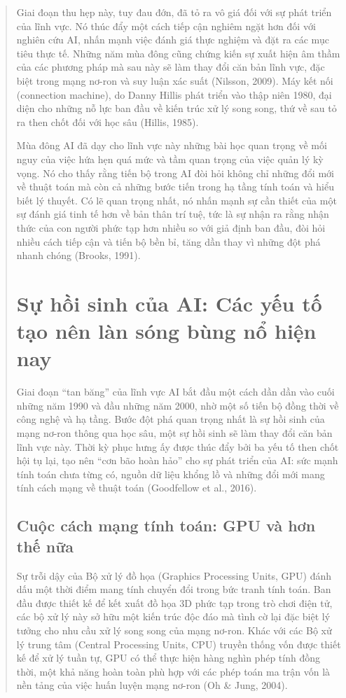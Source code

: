 \begin{quote}
Giai đoạn thu hẹp này, tuy đau đớn, đã tỏ ra vô giá đối với sự phát triển của lĩnh vực. Nó thúc đẩy một cách tiếp cận nghiêm ngặt hơn đối với nghiên cứu AI, nhấn mạnh việc đánh giá thực nghiệm và đặt ra các mục tiêu thực tế. Những năm mùa đông cũng chứng kiến sự xuất hiện âm thầm của các phương pháp mà sau này sẽ làm thay đổi căn bản lĩnh vực, đặc biệt trong mạng nơ-ron và suy luận xác suất (Nilsson, 2009). Máy kết nối (connection machine), do Danny Hillis phát triển vào thập niên 1980, đại diện cho những nỗ lực ban đầu về kiến trúc xử lý song song, thứ về sau tỏ ra then chốt đối với học sâu (Hillis, 1985).

Mùa đông AI đã dạy cho lĩnh vực này những bài học quan trọng về mối nguy của việc hứa hẹn quá mức và tầm quan trọng của việc quản lý kỳ vọng. Nó cho thấy rằng tiến bộ trong AI đòi hỏi không chỉ những đổi mới về thuật toán mà còn cả những bước tiến trong hạ tầng tính toán và hiểu biết lý thuyết. Có lẽ quan trọng nhất, nó nhấn mạnh sự cần thiết của một sự đánh giá tinh tế hơn về bản thân trí tuệ, tức là sự nhận ra rằng nhận thức của con người phức tạp hơn nhiều so với giả định ban đầu, đòi hỏi nhiều cách tiếp cận và tiến bộ bền bỉ, tăng dần thay vì những đột phá nhanh chóng (Brooks, 1991).

\section{Sự hồi sinh của AI: Các yếu tố tạo nên làn sóng bùng nổ hiện nay}

Giai đoạn ``tan băng'' của lĩnh vực AI bắt đầu một cách dần dần vào cuối những năm 1990 và đầu những năm 2000, nhờ một số tiến bộ đồng thời về công nghệ và hạ tầng. Bước đột phá quan trọng nhất là sự hồi sinh của mạng nơ-ron thông qua học sâu, một sự hồi sinh sẽ làm thay đổi căn bản lĩnh vực này. Thời kỳ phục hưng ấy được thúc đẩy bởi ba yếu tố then chốt hội tụ lại, tạo nên ``cơn bão hoàn hảo'' cho sự phát triển của AI: sức mạnh tính toán chưa từng có, nguồn dữ liệu khổng lồ và những đổi mới mang tính cách mạng về thuật toán (Goodfellow et al., 2016).

\subsection{Cuộc cách mạng tính toán: GPU và hơn thế nữa}

Sự trỗi dậy của Bộ xử lý đồ họa (Graphics Processing Units, GPU) đánh dấu một thời điểm mang tính chuyển đổi trong bức tranh tính toán. Ban đầu được thiết kế để kết xuất đồ họa 3D phức tạp trong trò chơi điện tử, các bộ xử lý này sở hữu một kiến trúc độc đáo mà tình cờ lại đặc biệt lý tưởng cho nhu cầu xử lý song song của mạng nơ-ron. Khác với các Bộ xử lý trung tâm (Central Processing Units, CPU) truyền thống vốn được thiết kế để xử lý tuần tự, GPU có thể thực hiện hàng nghìn phép tính đồng thời, một khả năng hoàn toàn phù hợp với các phép toán ma trận vốn là nền tảng của việc huấn luyện mạng nơ-ron (Oh \& Jung, 2004).


\end{quote}
